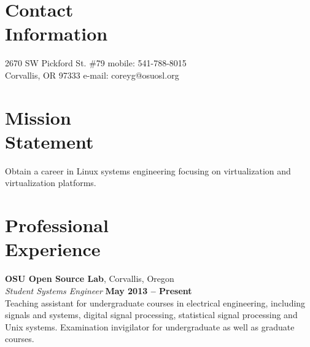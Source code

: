 \documentclass[margin,line]{resume}
\begin{document}
\begin{resume}

    \section{\mysidestyle Contact\\Information}

    2670 SW Pickford St. \#79   \hfill mobile: 541-788-8015         \vspace{0mm}\\\vspace{0mm}%
    Corvallis, OR 97333         \hfill e-mail: coreyg@osuosl.org  \vspace{0mm}\\\vspace{-4.5mm}

    \section{\mysidestyle Mission\\Statement}

    Obtain a career in Linux systems engineering focusing on virtualization  and virtualization platforms.

    \section{\mysidestyle Professional\\Experience}

    \textbf{OSU Open Source Lab}, Corvallis, Oregon \vspace{2mm}\\\vspace{1mm}%
    \textsl{Student Systems Engineer} \hfill \textbf{May 2013 -- Present}\\
    Teaching assistant for undergraduate courses in electrical engineering,
    including signals and systems, digital signal processing,
    statistical signal processing and Unix systems.
    Examination invigilator for undergraduate as well as graduate courses.



\end{resume}
\end{document}
